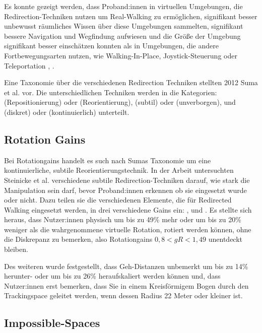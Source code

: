 Es konnte gezeigt werden, dass Proband:innen in virtuellen Umgebungen, die Redirection-Techniken nutzen um Real-Walking zu ermöglichen, signifikant besser unbewusst räumliches Wissen über diese Umgebungen sammelten, signifikant bessere Navigation und Wegfindung aufwiesen und die Größe der Umgebung signifikant besser einschätzen konnten als in Umgebungen, die andere Fortbewegungsarten nutzen, wie Walking-In-Place, Joystick-Steuerung oder Teleportation \cite{peck-vergleich-2011}, \cite{langbehn-vergleich-2018}.

Eine Taxonomie über die verschiedenen Redirection Techniken stellten 2012 Suma et al. \cite{taxonomy} vor. Die unterschiedlichen Techniken werden in die Kategorien:  (Repositionierung) oder  (Reorientierung),  (subtil) oder  (unverborgen), und  (diskret) oder  (kontinuierlich) unterteilt.


\subsection{Rotation Gains}

Bei Rotationgains handelt es such nach Sumas Taxonomie \cite{taxonomy} um eine kontinuierliche, subtile Reorientierungstechnik. In der Arbeit \cite{detection-thresholds} untersuchten Steinicke et al. verschiedene subtile Redirection-Techniken darauf, wie stark die Manipulation sein darf, bevor Proband:innen erkennen ob sie eingesetzt wurde oder nicht. Dazu teilen sie die verschiedenen Elemente, die für Redirected Walking eingesetzt werden, in drei verschiedene Gains ein: ,  und . Es stellte sich heraus, dass Nutzer:innen physisch um bis zu 49\% mehr oder um bis zu 20\% weniger als die wahrgenommene virtuelle Rotation, rotiert werden können, ohne die Diskrepanz zu bemerken, also Rotationgains $0,8 < gR < 1,49$ unentdeckt bleiben.

Des weiteren wurde festgestellt, dass Geh-Distanzen unbemerkt um bis zu 14\% herunter- oder um bis zu 26\% heraufskaliert werden können und, dass Nutzer:innen erst bemerken, dass Sie in einem Kreisförmigem Bogen durch den Trackingspace geleitet werden, wenn dessen Radius 22 Meter oder kleiner ist.

\subsection{Impossible-Spaces}

